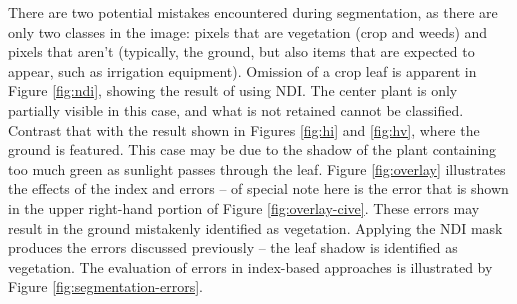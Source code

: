\documentclass[letterpaper]{report}
\begin{document}
{There are two potential mistakes encountered during segmentation, as there are only two classes in the image: pixels that are vegetation (crop and weeds) and pixels that aren't (typically, the ground, but also items that are expected to appear, such as irrigation equipment). Omission of a crop leaf is apparent in Figure \ref{fig:ndi}, showing the result of using NDI.  The center plant is only partially visible in this case, and what is not retained cannot be classified. Contrast that with the result shown in Figures \ref{fig:hi} and  \ref{fig:hv}, where the ground is featured. This case may be due to the shadow of the plant containing too much green as sunlight passes through the leaf. Figure \ref{fig:overlay} illustrates the effects of the index and errors -- of special note here is the error that is shown in the upper right-hand portion of Figure \ref{fig:overlay-cive}. These errors may result in the ground mistakenly identified as vegetation. Applying the NDI mask produces the errors discussed previously -- the leaf shadow is identified as vegetation. The evaluation of errors in index-based approaches is illustrated by Figure \ref{fig:segmentation-errors}.

}
\end{document}
